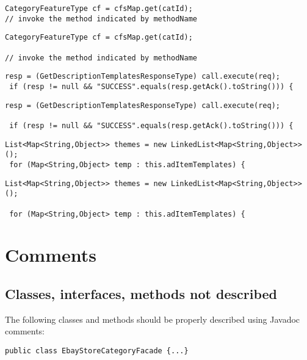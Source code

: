 \noindent\makebox[\linewidth]{\rule{\linewidth}{0.4pt}}
\begin{lstlisting}[firstnumber=184, caption={Lines 184-185 violation of the rule}]
CategoryFeatureType cf = cfsMap.get(catId);
// invoke the method indicated by methodName
\end{lstlisting}
\begin{lstlisting}[firstnumber=184, caption={Lines 184-185 possible solution}]
CategoryFeatureType cf = cfsMap.get(catId);

// invoke the method indicated by methodName
\end{lstlisting}
\noindent\makebox[\linewidth]{\rule{\linewidth}{0.4pt}}
\begin{lstlisting}[firstnumber=229, caption={Lines 229-230 violation of the rule}]
 resp = (GetDescriptionTemplatesResponseType) call.execute(req);
 if (resp != null && "SUCCESS".equals(resp.getAck().toString())) {
\end{lstlisting}
\begin{lstlisting}[firstnumber=229, caption={Lines 229-230 possible solution}]
 resp = (GetDescriptionTemplatesResponseType) call.execute(req);

 if (resp != null && "SUCCESS".equals(resp.getAck().toString())) {
\end{lstlisting}
\noindent\makebox[\linewidth]{\rule{\linewidth}{0.4pt}}
\begin{lstlisting}[firstnumber=284, caption={Lines 284-285 violation of the rule}]
 List<Map<String,Object>> themes = new LinkedList<Map<String,Object>>();
 for (Map<String,Object> temp : this.adItemTemplates) {
\end{lstlisting}
\begin{lstlisting}[firstnumber=284, caption={Lines 284-285 possible solution}]
 List<Map<String,Object>> themes = new LinkedList<Map<String,Object>>();

 for (Map<String,Object> temp : this.adItemTemplates) {
\end{lstlisting}


\section{Comments}
\subsection{Classes, interfaces, methods not described}
The following classes and methods should be properly described using Javadoc comments:
\begin{lstlisting}[firstnumber=57, caption={EbayStoreCategoryFacade class Javadoc missing}]
public class EbayStoreCategoryFacade {...}
\end{lstlisting}

